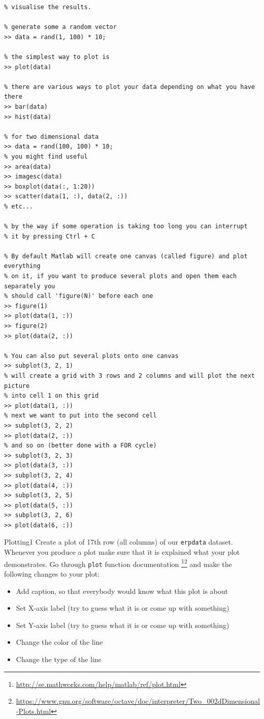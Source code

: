 \documentclass[a4paper,11pt]{article}
\begin{document}
%
%
\begin{lstlisting}[caption={Plotting}]
% One of the most important abilities in any data analysis task is the ability to
% visualise the results.

% generate some a random vector
>> data = rand(1, 100) * 10;

% the simplest way to plot is
>> plot(data)

% there are various ways to plot your data depending on what you have there
>> bar(data)
>> hist(data)

% for two dimensional data
>> data = rand(100, 100) * 10;
% you might find useful
>> area(data)
>> imagesc(data)
>> boxplot(data(:, 1:20))
>> scatter(data(1, :), data(2, :))
% etc...

% by the way if some operation is taking too long you can interrupt
% it by pressing Ctrl + C

% By default Matlab will create one canvas (called figure) and plot everything
% on it, if you want to produce several plots and open them each separately you
% should call 'figure(N)' before each one
>> figure(1)
>> plot(data(1, :))
>> figure(2)
>> plot(data(2, :))

% You can also put several plots onto one canvas
>> subplot(3, 2, 1)
% will create a grid with 3 rows and 2 columns and will plot the next picture
% into cell 1 on this grid
>> plot(data(1, :))
% next we want to put into the second cell
>> subplot(3, 2, 2)
>> plot(data(2, :))
% and so on (better done with a FOR cycle)
>> subplot(3, 2, 3)
>> plot(data(3, :))
>> subplot(3, 2, 4)
>> plot(data(4, :))
>> subplot(3, 2, 5)
>> plot(data(5, :))
>> subplot(3, 2, 6)
>> plot(data(6, :))

\end{lstlisting}


%
%
\begin{exercise}{3}{Plotting}{1}
Create a plot of 17th row (all columns) of our \texttt{erpdata} dataset. Whenever you produce a plot make sure that it is explained what your plot demonstrates. Go through \texttt{plot} function documentation \footnote{\url{http://se.mathworks.com/help/matlab/ref/plot.html}}\footnote{\url{https://www.gnu.org/software/octave/doc/interpreter/Two_002dDimensional-Plots.html}} and make the following changes to your plot:
\begin{itemize}
    \item Add caption, so that everybody would know what this plot is about
    \item Set X-axis label (try to guess what it is or come up with something)
    \item Set Y-axis label (try to guess what it is or come up with something)
    \item Change the color of the line
    \item Change the type of the line
\end{itemize}
\end{exercise}
\end{document}
